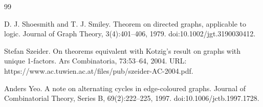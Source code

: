 \documentclass[10pt,a4paper]{amsart}
\begin{document}
\begin{thebibliography}{99}
\par\noindent  [37]  D. J. Shoesmith and T. J. Smiley.  Theorem on directed graphs, applicable to logic.  Journal of Graph Theory, 3(4):401–406, 1979.  doi:10.1002/jgt.3190030412.  
 
\par\noindent  [38]  Stefan Szeider.  On theorems equivalent with Kotzig’s result on graphs with unique 1-factors.  Ars Combinatoria, 73:53–64, 2004.  URL: https://www.ac.tuwien.ac.at/files/pub/szeider-AC-2004.pdf.  
 
\par\noindent  [39]  Anders Yeo.  A note on alternating cycles in edge-coloured graphs.  Journal of Combinatorial Theory, Series B, 69(2):222–225, 1997.  doi:10.1006/jctb.1997.1728.  
  
\end{thebibliography}
\end{document}
